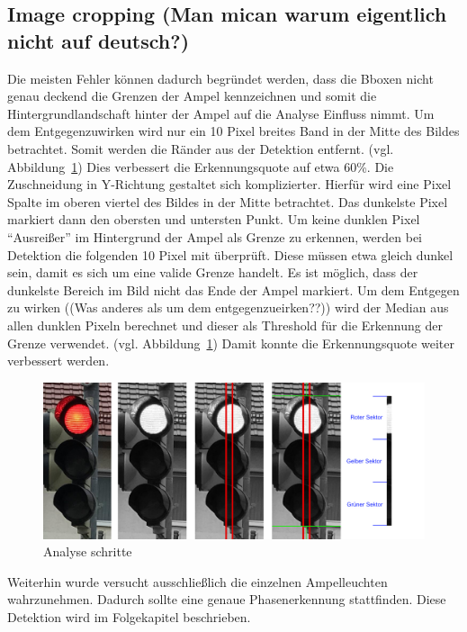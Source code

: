 \documentclass[a4paper,oneside,12pt]{report}
\begin{document}
\begin{onehalfspace}
		\section{Image cropping (Man mican warum eigentlich nicht auf deutsch?)}
		Die meisten Fehler können dadurch begründet werden, dass die Bboxen nicht genau deckend die Grenzen der Ampel kennzeichnen und somit die Hintergrundlandschaft hinter der Ampel auf die Analyse Einfluss nimmt. Um dem Entgegenzuwirken wird nur ein 10 Pixel breites Band in der Mitte des Bildes betrachtet. Somit werden die Ränder aus der Detektion entfernt. (vgl. Abbildung~\ref{fig:TLCrop}) \newline
		Dies verbessert die Erkennungsquote auf etwa 60\%.\newline
		Die Zuschneidung in Y-Richtung gestaltet sich komplizierter. Hierfür wird eine Pixel Spalte im oberen viertel des Bildes in der Mitte betrachtet. Das dunkelste Pixel markiert dann den obersten und untersten Punkt. Um keine dunklen Pixel "`Ausreißer"' im Hintergrund der Ampel als Grenze zu erkennen, werden bei Detektion die folgenden 10 Pixel mit überprüft. Diese müssen etwa gleich dunkel sein, damit es sich um eine valide Grenze handelt. Es ist möglich, dass der dunkelste Bereich im Bild nicht das Ende der Ampel markiert. Um dem Entgegen zu wirken ((Was anderes als um dem entgegenzueirken??)) wird der Median aus allen dunklen Pixeln berechnet und dieser als Threshold für die Erkennung der Grenze verwendet. (vgl. Abbildung~\ref{fig:TLCrop}) Damit konnte die Erkennungsquote weiter verbessert werden.\newline
		\begin{figure}[h!]
			\includegraphics[width=\linewidth]{TLCropping.jpg}
			\caption{Analyse schritte}
			\label{fig:TLCrop}
		\end{figure}
		Weiterhin wurde versucht ausschließlich die einzelnen Ampelleuchten wahrzunehmen. Dadurch sollte eine genaue Phasenerkennung stattfinden. Diese Detektion wird im Folgekapitel beschrieben.

\end{onehalfspace}
\end{document}
